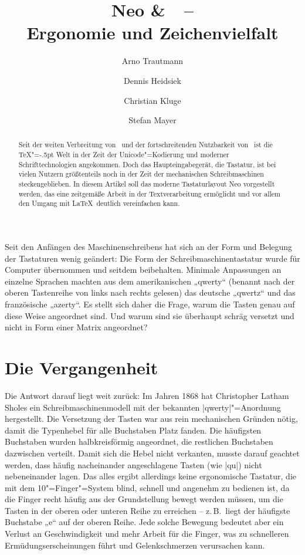 \documentclass[ngerman]{dtk}
\title{Neo \&\ \XeLaTeX\ –\\ Ergonomie und Zeichenvielfalt}
\author{Arno Trautmann\and Dennis Heidsiek\and Christian Kluge\and Stefan Mayer}
\begin{document}
\setmonofont[Scale=0.8]{DejaVu Sans Mono}
\maketitle
\begin{abstract}
Seit der weiten Verbreitung von \XeTeX\ und der fortschreitenden Nutzbarkeit von \LuaTeX\ ist die  \TeX"=\kern-.5pt Welt in der Zeit der Unicode"=Kodierung und moderner Schrifttechnologien angekommen. Doch das Haupteingabegerät, die Tastatur, ist bei vielen Nutzern größtenteils noch in der Zeit der mechanischen Schreibmaschinen steckengeblieben. In diesem Artikel soll das moderne Tastaturlayout Neo vorgestellt werden, das eine zeitgemäße Arbeit in der Textverarbeitung ermöglicht und vor allem den Umgang mit \LaTeX\ deutlich vereinfachen kann.
\end{abstract}
Seit den Anfängen des Maschinenschreibens hat sich an der Form und Belegung der Tastaturen wenig geändert: Die Form der Schreibmaschinentastatur wurde für Computer übernommen und seitdem beibehalten. Minimale Anpassungen an einzelne Sprachen machten aus dem amerikanischen „\hbox{qwerty}“ (benannt nach der oberen Tastenreihe von links nach rechts gelesen) das deutsche „qwertz“ und das französische „azerty“. Es stellt sich daher die Frage, warum die Tasten genau auf diese Weise angeordnet sind. Und warum sind sie überhaupt schräg versetzt und nicht in Form einer Matrix angeordnet?

\section{Die Vergangenheit}
Die Antwort darauf liegt weit zurück: Im Jahren 1868 hat Christopher Latham Sholes ein Schreibmaschinenmodell mit der bekannten |qwerty|"=Anordnung hergestellt.\cite{patentqwerty} Die Versetzung der Tasten war aus rein mechanischen Gründen nötig, damit die Typenhebel für alle Buchstaben Platz fanden. Die häufigsten Buchstaben wurden halbkreisförmig angeordnet, die restlichen Buchstaben dazwischen verteilt. Damit sich die Hebel nicht verkanten, musste darauf geachtet werden, dass häufig nacheinander angeschlagene Tasten (wie |qu|) nicht nebeneinander lagen. Das alles ergibt allerdings keine ergonomische Tastatur, die mit dem 10"=Finger"=System blind, schnell und angenehm zu bedienen ist, da die Finger recht häufig aus der Grundstellung bewegt werden müssen, um die Tasten in der oberen oder unteren Reihe zu erreichen – z.\,B.\ liegt der häufigste Buchstabe „e“ auf der oberen Reihe. Jede solche Bewegung bedeutet aber ein Verlust an Geschwindigkeit und mehr Arbeit für die Finger, was zu schnelleren Ermüdungserscheinungen führt und Gelenkschmerzen verursachen kann.
\end{document}
